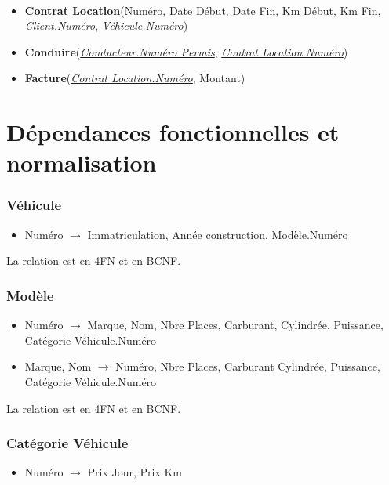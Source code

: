\documentclass[a4paper]{article}
\newenvironment{changemargin}[2]{%
\begin{list}{}{%
\setlength{\topsep}{0pt}%
\setlength{\leftmargin}{#1}%
\setlength{\rightmargin}{#2}%
\setlength{\listparindent}{\parindent}%
\setlength{\itemindent}{\parindent}%
\setlength{\parsep}{\parskip}%
}%
\item[]}{\end{list}}
\begin{document}
\begin{changemargin}{-1cm}{-1cm}
    \paragraph{}
    \begin{itemize}
        \item \textbf{Contrat Location}(\underline{Numéro}, Date Début, 
        Date Fin, Km Début, Km Fin, \textit{Client.Numéro}, 
        \textit{Véhicule.Numéro})
        \item \textbf{Conduire}(\textit{\underline{Conducteur.Numéro Permis}}, 
        \textit{\underline{Contrat Location.Numéro}})
        \item \textbf{Facture}(\textit{\underline{Contrat Location.Numéro}}, 
        Montant)
    \end{itemize}

\section{Dépendances fonctionnelles et normalisation}

    \subsubsection{Véhicule}
    \begin{itemize}
        \item Numéro $\rightarrow$ Immatriculation, Année construction,
        Modèle.Numéro
    \end{itemize}

    La relation est en 4FN et en BCNF.

    \subsubsection{Modèle}
    \begin{itemize}
        \item Numéro $\rightarrow$ Marque, Nom, Nbre Places, Carburant,
        Cylindrée, Puissance, Catégorie Véhicule.Numéro
        \item Marque, Nom $\rightarrow$ Numéro, Nbre Places, Carburant 
        Cylindrée, Puissance, Catégorie Véhicule.Numéro
    \end{itemize}

    La relation est en 4FN et en BCNF.

    \subsubsection{Catégorie Véhicule}
    \begin{itemize}
        \item Numéro $\rightarrow$ Prix Jour, Prix Km
    \end{itemize}


\end{changemargin}
\end{document}

